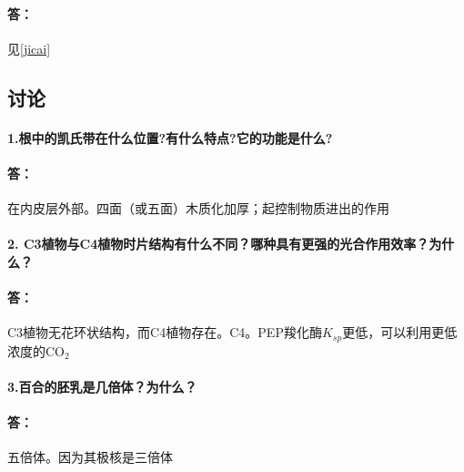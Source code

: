 \documentclass[UTF8]{ctexart}
\begin{document}
\paragraph*{答：}见\ref{jicai}
\subsection*{讨论}
\paragraph*{1.根中的凯氏带在什么位置?有什么特点?它的功能是什么?}
\paragraph*{答：}在内皮层外部。四面（或五面）木质化加厚；起控制物质进出的作用
\paragraph*{2. C3植物与C4植物时片结构有什么不同？哪种具有更强的光合作用效率？为什么？}
\paragraph*{答：}C3植物无花环状结构，而C4植物存在。C4。PEP羧化酶$K_{sp}$更低，可以利用更低浓度的CO$_2$
\paragraph*{3.百合的胚乳是几倍体？为什么？}
\paragraph*{答：}五倍体。因为其极核是三倍体
\end{document}
